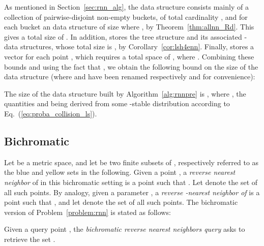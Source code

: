 As mentioned in Section~\ref{sec:rnn_alg}, the  data
structure consists mainly of a collection of pairwise-disjoint
non-empty buckets, of total cardinality , and for each bucket 
an  data structure of size  where , by
Theorem~\ref{thm:allnn_Rd}. This gives a total size of .  In addition,  stores
the tree structure  and its associated -\pleb data
structures, whose total size is , by
Corollary~\ref{cor:lsh4enn}. Finally,  stores a vector
 for each point , which requires a total space of , where .
Combining these bounds and using the fact that ,
we obtain the following bound on the size of the data structure (where
 and  have been renamed respectively  and
 for convenience):
\begin{thm}\label{thm:rnnspaceusage}
  The size of the data structure  built by
  Algorithm~\ref{alg:rnnpre} is , where , the quantities  and
   being derived from some
  -stable distribution  according to
  Eq.~(\ref{eq:proba_collision_ls}).
\end{thm}





\subsection{Bichromatic \rnn}
\label{sec:rnn_bichro}

Let  be a metric space, and let  be two finite
subsets of , respectively referred to as the blue and yellow sets
in the following. Given a point , a {\em reverse nearest neighbor}
of  in this bichromatic setting is a point 
such that . Let  denote the
set of all such points. By analogy, given a parameter ,
a {\em reverse -nearest neighbor of } is a point  such that , and let
 denote the set of all such points. The bichromatic
version of Problem~\ref{problem:rnn} is
stated as follows:
\begin{problem} \label{problem:bichro-rnn}
  Given a query point , the {\em bichromatic reverse nearest
    neighbors query} asks to retrieve the set .
\end{problem}


\begin{comment}
What makes bichromatic \rnn search generally more difficult than
the monochromatic version is that arbitrarily many blue points may lie
close to the query point , whereas in the monochromatic setting
only a limited number of data points can lie close to , even though
this limit is exponential in the ambient dimension~\cite{PZ04}. This
means that the output set in the bichromatic setting can be
arbitrarily larger, which makes it even more important to work out
output-sensitive running time bounds.
\end{comment}


